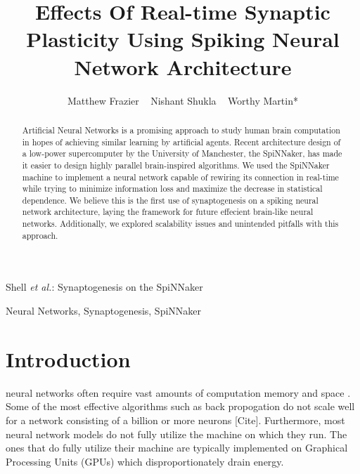 \documentclass[journal]{./sty/IEEEtran}
\begin{document}
%
\title{Effects Of Real-time Synaptic Plasticity Using Spiking Neural Network Architecture
}


\author{Matthew Frazier ~
        Nishant Shukla ~
        Worthy Martin* }

%
{Shell \MakeLowercase{\textit{et al.}}: Synaptogenesis on the SpiNNaker}


\maketitle

\begin{abstract}
Artificial Neural Networks is a promising approach to study human brain computation in hopes of achieving similar learning by artificial agents.
Recent architecture design of a low-power supercomputer by the University of Manchester, the SpiNNaker,
has made it easier to design highly parallel brain-inspired algorithms.
We used the SpiNNaker machine to implement a neural network capable of rewiring its connection 
in real-time while trying to minimize information loss and maximize the decrease in statistical dependence.
We believe this is the first use of synaptogenesis on a spiking neural network architecture, 
laying the framework for future effecient brain-like neural networks.
Additionally, we explored scalability issues and unintended pitfalls with this approach.

\end{abstract}

\begin{IEEEkeywords}
Neural Networks, Synaptogenesis, SpiNNaker
\end{IEEEkeywords}

\section{Introduction}
 neural networks often require vast amounts of computation memory and space \cite{CorrMatr:Levy}.
Some of the most effective algorithms such as back propogation do not scale well for a network consisting of a billion or more neurons [Cite].
Furthermore, most neural network models do not fully utilize the machine on which they run. 
The ones that do fully utilize their machine are typically implemented on Graphical Processing Units (GPUs) which disproportionately drain energy.
\end{document}
